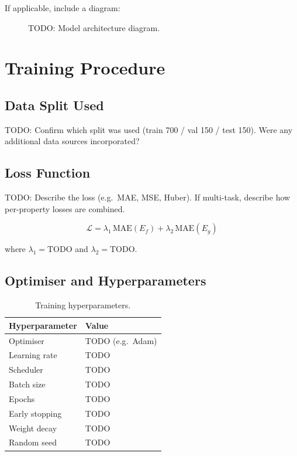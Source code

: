 \documentclass[10pt, a4paper]{article}
\begin{document}
If applicable, include a diagram:
\begin{figure}[h!]
  \centering
  \caption{TODO: Model architecture diagram.}
  \label{fig:architecture}
\end{figure}

\section{Training Procedure}

\subsection{Data Split Used}
TODO: Confirm which split was used (train 700 / val 150 / test 150).
Were any additional data sources incorporated?

\subsection{Loss Function}
TODO: Describe the loss (e.g.\ MAE, MSE, Huber). If multi-task, describe
how per-property losses are combined.

$$\mathcal{L} = \lambda_1 \, \text{MAE}(E_f) + \lambda_2 \, \text{MAE}(E_g)$$

where \(\lambda_1 = \text{TODO}\) and \(\lambda_2 = \text{TODO}\).

\subsection{Optimiser and Hyperparameters}
\begin{table}[h!]
\centering
\caption{Training hyperparameters.}
\label{tab:hparams}
\begin{tabular}{@{}ll@{}}
\toprule
Hyperparameter & Value \\
\midrule
Optimiser           & TODO (e.g.\ Adam) \\
Learning rate       & TODO \\
Scheduler           & TODO \\
Batch size          & TODO \\
Epochs              & TODO \\
Early stopping      & TODO \\
Weight decay        & TODO \\
Random seed         & TODO \\
\bottomrule
\end{tabular}
\end{table}
\end{document}
